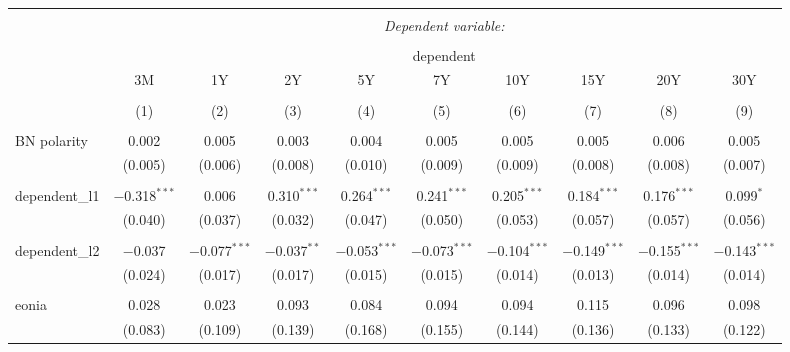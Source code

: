 


\begin{table}[!htbp] \centering 
  \caption{} 
  \label{} 
  \begin{adjustbox}{width=1.35\textwidth}
\begin{tabular}{@{\extracolsep{5pt}}lccccccccc} 
\\[-1.8ex]\hline 
\hline \\[-1.8ex] 
 & \multicolumn{9}{c}{\textit{Dependent variable:}} \\ 
\cline{2-10} 
\\[-1.8ex] & \multicolumn{9}{c}{dependent} \\ 
 & 3M & 1Y & 2Y & 5Y & 7Y & 10Y & 15Y & 20Y & 30Y \\ 
\\[-1.8ex] & (1) & (2) & (3) & (4) & (5) & (6) & (7) & (8) & (9)\\ 
\hline \\[-1.8ex] 
 BN polarity & 0.002 & 0.005 & 0.003 & 0.004 & 0.005 & 0.005 & 0.005 & 0.006 & 0.005 \\ 
  & (0.005) & (0.006) & (0.008) & (0.010) & (0.009) & (0.009) & (0.008) & (0.008) & (0.007) \\ 
  & & & & & & & & & \\ 
 dependent\_l1 & $-$0.318$^{***}$ & 0.006 & 0.310$^{***}$ & 0.264$^{***}$ & 0.241$^{***}$ & 0.205$^{***}$ & 0.184$^{***}$ & 0.176$^{***}$ & 0.099$^{*}$ \\ 
  & (0.040) & (0.037) & (0.032) & (0.047) & (0.050) & (0.053) & (0.057) & (0.057) & (0.056) \\ 
  & & & & & & & & & \\ 
 dependent\_l2 & $-$0.037 & $-$0.077$^{***}$ & $-$0.037$^{**}$ & $-$0.053$^{***}$ & $-$0.073$^{***}$ & $-$0.104$^{***}$ & $-$0.149$^{***}$ & $-$0.155$^{***}$ & $-$0.143$^{***}$ \\ 
  & (0.024) & (0.017) & (0.017) & (0.015) & (0.015) & (0.014) & (0.013) & (0.014) & (0.014) \\ 
  & & & & & & & & & \\ 
 eonia & 0.028 & 0.023 & 0.093 & 0.084 & 0.094 & 0.094 & 0.115 & 0.096 & 0.098 \\ 
  & (0.083) & (0.109) & (0.139) & (0.168) & (0.155) & (0.144) & (0.136) & (0.133) & (0.122) \\ 

\end{tabular}
\end{adjustbox}
\end{table}
